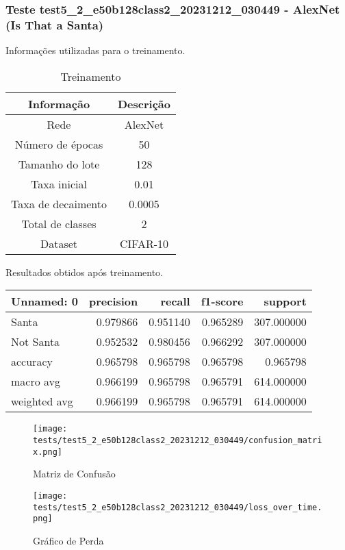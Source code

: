 \subsubsection{Teste test5_2_e50b128class2_20231212_030449 - AlexNet (Is That a Santa)}

Informações utilizadas para o treinamento.

\begin{table}[ht]
   \centering
   \caption{Treinamento}
   \label{tab:modelos}
   \begin{tabular}{| c | c | }
      \hline 
      \textbf{Informação} & \textbf{Descrição} \\
      \hline \hline 
      Rede & AlexNet \\
      \hline
      Número de épocas & 50\\
      \hline
      Tamanho do lote & 128\\
      \hline
      Taxa inicial & 0.01 \\
      \hline
      Taxa de decaimento & 0.0005 \\
      \hline
      Total de classes & 2\\
      \hline
      Dataset & CIFAR-10\\
      \hline
   \end{tabular} 
\end{table}

Resultados obtidos após treinamento.

\begin{tabular}{lrrrr}
\toprule
  Unnamed: 0 &  precision &   recall &  f1-score &    support \\
\midrule
       Santa &   0.979866 & 0.951140 &  0.965289 & 307.000000 \\
   Not Santa &   0.952532 & 0.980456 &  0.966292 & 307.000000 \\
    accuracy &   0.965798 & 0.965798 &  0.965798 &   0.965798 \\
   macro avg &   0.966199 & 0.965798 &  0.965791 & 614.000000 \\
weighted avg &   0.966199 & 0.965798 &  0.965791 & 614.000000 \\
\bottomrule
\end{tabular}


\begin{figure}[ht]
 \begin{center}
   \texttt{[image: tests/test5\_2\_e50b128class2\_20231212\_030449/confusion\_matrix.png]}
  \caption{Matriz de Confusão}
  \label{fig:fig03}
 \end{center}
\end{figure}

\begin{figure}[ht]
 \begin{center}
   \texttt{[image: tests/test5\_2\_e50b128class2\_20231212\_030449/loss\_over\_time.png]}
  \caption{Gráfico de Perda}
  \label{fig:fig04}
 \end{center}
\end{figure}
